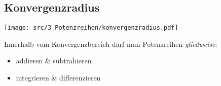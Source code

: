 \subsection{Konvergenzradius}
    \vspace{-0.5em}
    \begin{center}
            \texttt{[image: src/3\_Potenzreihen/konvergenzradius.pdf]}
    \end{center}
    Innerhalb vom Konvergenzbereich darf man Potenzreihen \textit{gliedweise}:
    \begin{itemize}
        \item addieren \& subtrahieren
        \item integrieren \& differenzieren
    \end{itemize}